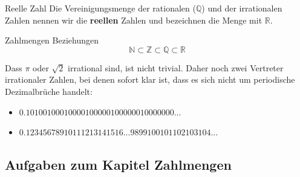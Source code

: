 \begin{definition}{Reelle Zahl}{}
Die Vereinigungsmenge der rationalen ($\mathbb{Q}$) und der irrationalen Zahlen
nennen wir die \textbf{reellen} Zahlen und bezeichnen die Menge mit $\mathbb{R}$.
\end{definition}

\begin{gesetz}{Zahlmengen Beziehungen}{}
$$\mathbb{N} \subset \mathbb{Z} \subset \mathbb{Q} \subset \mathbb{R} $$
\end{gesetz}


Dass $\pi$ oder $\sqrt{2}$ irrational sind, ist nicht trivial. Daher
noch zwei Vertreter irrationaler Zahlen, bei denen sofort klar ist,
dass es sich nicht um periodische Dezimalbrüche handelt:
\begin{itemize}
\item $0.10 100 100010000100000100000010000000...$
\item $0.12345678910111213141516 ... 9899100101102103104 ... $
\end{itemize}
\newpage


\subsection*{Aufgaben zum Kapitel Zahlmengen}

